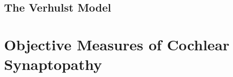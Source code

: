 \subsection{The Verhulst Model} %
\label{sub:the_verhulst_model}



\section{Objective Measures of Cochlear Synaptopathy} %
\label{sec:objective_measures_of_cochlear_synaptopathy}

